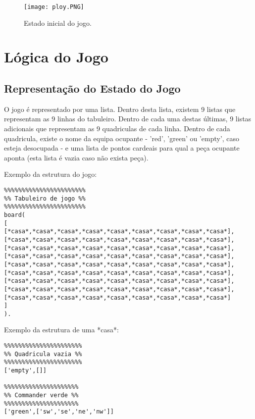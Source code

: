 \documentclass[a4paper]{article}
\begin{document}
\begin{figure}[ht]
\caption{Estado inicial do jogo.}
\centering
\texttt{[image: ploy.PNG]}
\end{figure}
\section{Lógica do Jogo}


\subsection{Representação do Estado do Jogo}
O jogo é representado por uma lista. Dentro desta lista, existem 9 listas que representam as 9 linhas do tabuleiro. Dentro de cada uma destas últimas, 9 listas adicionais que representam as 9 quadriculas de cada linha. Dentro de cada quadricula, existe o nome da equipa ocupante - 'red', 'green' ou 'empty', caso esteja desocupada - e uma lista de pontos cardeais para qual a peça ocupante aponta (esta lista é vazia caso não exista peça).

Exemplo da estrutura do jogo:
\begin{verbatim}
%%%%%%%%%%%%%%%%%%%%%%%
%% Tabuleiro de jogo %%
%%%%%%%%%%%%%%%%%%%%%%%
board(
[
[*casa*,*casa*,*casa*,*casa*,*casa*,*casa*,*casa*,*casa*,*casa*],
[*casa*,*casa*,*casa*,*casa*,*casa*,*casa*,*casa*,*casa*,*casa*],
[*casa*,*casa*,*casa*,*casa*,*casa*,*casa*,*casa*,*casa*,*casa*],
[*casa*,*casa*,*casa*,*casa*,*casa*,*casa*,*casa*,*casa*,*casa*],
[*casa*,*casa*,*casa*,*casa*,*casa*,*casa*,*casa*,*casa*,*casa*],
[*casa*,*casa*,*casa*,*casa*,*casa*,*casa*,*casa*,*casa*,*casa*],
[*casa*,*casa*,*casa*,*casa*,*casa*,*casa*,*casa*,*casa*,*casa*],
[*casa*,*casa*,*casa*,*casa*,*casa*,*casa*,*casa*,*casa*,*casa*],
[*casa*,*casa*,*casa*,*casa*,*casa*,*casa*,*casa*,*casa*,*casa*]
]
).
\end{verbatim}

Exemplo da estrutura de uma *casa*:
\begin{verbatim}
%%%%%%%%%%%%%%%%%%%%%%
%% Quadricula vazia %%
%%%%%%%%%%%%%%%%%%%%%%
['empty',[]]

%%%%%%%%%%%%%%%%%%%%%
%% Commander verde %%
%%%%%%%%%%%%%%%%%%%%%
['green',['sw','se','ne','nw']]
\end{verbatim}
\end{document}
